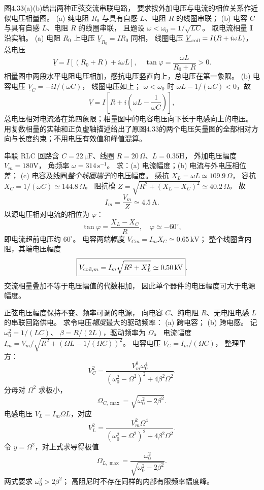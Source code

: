 图4.33(a)(b)给出两种正弦交流串联电路，
要求按外加电压与电流的相位关系作近似电压相量图。
(a) 纯电阻 $R_0$ 与具有自感 $L$、电阻 $R$ 的线圈串联；
(b) 电容 $C$ 与具有自感 $L$、电阻 $R$ 的线圈串联，
且题设 $\omega<\omega_0=1/\sqrt{LC}$。
\exsolution
取电流相量 $\bm I$ 沿实轴。
(a) 电阻 $R_0$ 上电压
$\underline V_{R_0}=IR_0$ 同相，
线圈电压
$\underline V_{\rm coil}=I(R+i\omega L)$，
总电压
\[
\boxed{\underline V=I[(R_0+R)+i\omega L]},
\quad
\tan\varphi=\frac{\omega L}{R_0+R}>0.
\]
相量图中两段水平电阻电压相加，感抗电压竖直向上，总电压在第一象限。
(b) 电容电压
$\underline V_C=-iI/(\omega C)$，
线圈电压如上；
$\omega<\omega_0$ 时
$\omega L-1/(\omega C)<0$，故
\[
\boxed{\underline V=I\left[
R+i\left(\omega L-\frac1{\omega C}\right)\right]},
\]
总电压相对电流落在第四象限；相量图中的电容电压向下长于电感向上的电压。
\excheck 用复数相量的实轴和正负虚轴描述给出了原图4.33的两个电压矢量图的全部相对方向与长度约束；不用电压有效值和峰值混算。

串联 RLC 回路含
$C=22\,\mathrm{\mu F}$、线圈
$R=20\,\Omega$、$L=0.35$H，
外加电压幅度 $V_m=180$V，
角频率 $\omega=314\,\mathrm{s^{-1}}$。
求：(a) 电流幅度；(b) 电流与外电压相位差；
(c) 电容及线圈\emph{整个线圈端子}的电压幅度。
\exsolution
感抗 $X_L=\omega L\simeq109.9\,\Omega$，
容抗 $X_C=1/(\omega C)\simeq144.8\,\Omega$。
阻抗模
$Z=\sqrt{R^2+(X_L-X_C)^2}\simeq40.2\,\Omega$。
故
\[
\boxed{I_m=\frac{V_m}{Z}\simeq4.5\,\mathrm A}.
\]
以源电压相对电流的相位为 $\varphi$：
\[
\boxed{\tan\varphi=\frac{X_L-X_C}{R}},
\quad\boxed{\varphi\simeq-60^\circ},
\]
即电流超前电压约 $60^\circ$。
电容两端幅度
$\boxed{V_{Cm}=I_mX_C\simeq0.65\,\mathrm{kV}}$；
整个线圈含内阻，其端电压幅度
\[
\boxed{V_{{\rm coil},m}
=I_m\sqrt{R^2+X_L^2}\simeq0.50\,\mathrm{kV}}.
\]
\excheck 交流相量叠加不等于电压幅值的代数相加，
因此单个器件的电压幅度可大于电源幅度。

正弦电压幅度保持不变、频率可调的电源，
向电容 $C$、纯电阻 $R$、无电阻电感 $L$ 的串联回路供电。
求令电压\emph{幅度}最大的驱动频率：
(a) 跨电容；
(b) 跨电感。
\exsolution
记 $\omega_0^2=1/(LC)$、
$\beta=R/(2L)$，驱动频率为 $\Omega$。
电流幅度
$I_m=V_m/\sqrt{R^2+(\Omega L-1/(\Omega C))^2}$。
电容电压
$V_C=I_m/(\Omega C)$，
整理平方：
\[
V_C^2=\frac{V_m^2\omega_0^4}
{(\omega_0^2-\Omega^2)^2+4\beta^2\Omega^2}.
\]
分母对 $\Omega^2$ 求极小，
\[
\boxed{\Omega_{C,\max}=
\sqrt{\omega_0^2-2\beta^2}}.
\]
电感电压
$V_L=I_m\Omega L$，对应
\[
V_L^2=\frac{V_m^2\Omega^4}
{(\omega_0^2-\Omega^2)^2+4\beta^2\Omega^2}.
\]
令 $y=\Omega^2$，对上式求导得极值
\[
\boxed{\Omega_{L,\max}
=\frac{\omega_0^2}
{\sqrt{\omega_0^2-2\beta^2}}}.
\]
\excheck 两式要求 $\omega_0^2>2\beta^2$；
高阻尼时不存在同样的内部有限频率幅度峰。
